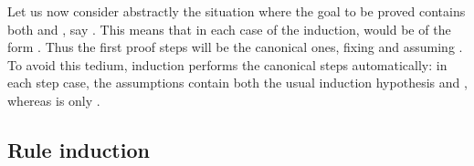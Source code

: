 \begin{isabellebody}
\begin{isamarkuptext}
Let us now consider abstractly the situation where the goal to be proved
contains both \isa{{\isasymAnd}} and \isa{{\isasymLongrightarrow}}, say .
This means that in each case of the induction,
 would be of the form .  Thus the
first proof steps will be the canonical ones, fixing  and assuming
. To avoid this tedium, induction performs the canonical steps
automatically: in each step case, the assumptions contain both the
usual induction hypothesis and , whereas  is only
.

\subsection{Rule induction}


\end{isamarkuptext}
\end{isabellebody}
